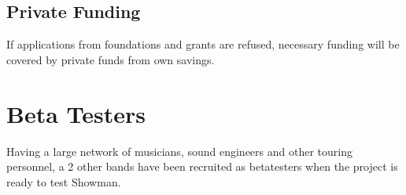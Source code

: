 \subsection{Private Funding}
If applications from foundations and grants are refused, necessary funding will be covered by private funds from own savings. \\

\section{Beta Testers}
Having a large network of musicians, sound engineers and other touring personnel, a 2 other bands have been recruited as betatesters when the project is ready to test Showman. \newline
